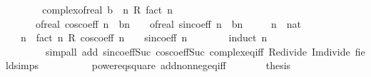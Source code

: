 \begin{isabellebody}
%
\endisadelimproof
%
\isatagproof
{}\isamarkupfalse%
\ {\isacharminus}{\kern0pt}\isanewline
\ \ \isamarkupfalse%
\ {\isachardoublequoteopen}{\isacharparenleft}{\kern0pt}{\isasymi}\ {\isacharasterisk}{\kern0pt}\ complex{\isacharunderscore}{\kern0pt}of{\isacharunderscore}{\kern0pt}real\ b{\isacharparenright}{\kern0pt}\ {\isacharcircum}{\kern0pt}\ n\ {\isacharslash}{\kern0pt}\isactrlsub R\ fact\ n\ {\isacharequal}{\kern0pt}\isanewline
\ \ \ \ \ \ of{\isacharunderscore}{\kern0pt}real\ {\isacharparenleft}{\kern0pt}cos{\isacharunderscore}{\kern0pt}coeff\ n\ {\isacharasterisk}{\kern0pt}\ b{\isacharcircum}{\kern0pt}n{\isacharparenright}{\kern0pt}\ {\isacharplus}{\kern0pt}\ {\isasymi}\ {\isacharasterisk}{\kern0pt}\ of{\isacharunderscore}{\kern0pt}real\ {\isacharparenleft}{\kern0pt}sin{\isacharunderscore}{\kern0pt}coeff\ n\ {\isacharasterisk}{\kern0pt}\ b{\isacharcircum}{\kern0pt}n{\isacharparenright}{\kern0pt}{\isachardoublequoteclose}\isanewline
\ \ \ \ \ n\ {\isacharcolon}{\kern0pt}{\isacharcolon}{\kern0pt}\ nat\isanewline
\ \ \isamarkupfalse%
\ {\isacharminus}{\kern0pt}\isanewline
\ \ \ \ \isamarkupfalse%
\ {\isachardoublequoteopen}{\isasymi}\ {\isacharcircum}{\kern0pt}\ n\ {\isacharequal}{\kern0pt}\ fact\ n\ {\isacharasterisk}{\kern0pt}\isactrlsub R\ {\isacharparenleft}{\kern0pt}cos{\isacharunderscore}{\kern0pt}coeff\ n\ {\isacharplus}{\kern0pt}\ {\isasymi}\ {\isacharasterisk}{\kern0pt}\ sin{\isacharunderscore}{\kern0pt}coeff\ n{\isacharparenright}{\kern0pt}{\isachardoublequoteclose}\isanewline
\ \ \ \ \ \ \isamarkupfalse%
\ {\isacharparenleft}{\kern0pt}induct\ n{\isacharparenright}{\kern0pt}\isanewline
\ \ \ \ \ \ \ \ {\isacharparenleft}{\kern0pt}simp{\isacharunderscore}{\kern0pt}all\ add{\isacharcolon}{\kern0pt}\ sin{\isacharunderscore}{\kern0pt}coeff{\isacharunderscore}{\kern0pt}Suc\ cos{\isacharunderscore}{\kern0pt}coeff{\isacharunderscore}{\kern0pt}Suc\ complex{\isacharunderscore}{\kern0pt}eq{\isacharunderscore}{\kern0pt}iff\ Re{\isacharunderscore}{\kern0pt}divide\ Im{\isacharunderscore}{\kern0pt}divide\ field{\isacharunderscore}{\kern0pt}simps\isanewline
\ \ \ \ \ \ \ \ \ \ power{}{\isacharunderscore}{\kern0pt}eq{\isacharunderscore}{\kern0pt}square\ add{\isacharunderscore}{\kern0pt}nonneg{\isacharunderscore}{\kern0pt}eq{\isacharunderscore}{\kern0pt}{}{\isacharunderscore}{\kern0pt}iff{\isacharparenright}{\kern0pt}\isanewline
\ \ \ \ \isamarkupfalse%
\ \isamarkupfalse%
\ {\isacharquery}{\kern0pt}thesis\isanewline

\end{isabellebody}
